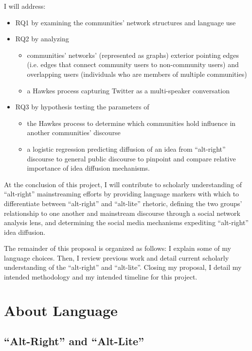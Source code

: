 \documentclass[acmlarge, screen, authorversion]{acmart}
\begin{document}
I will address:
\begin{itemize}
    \item RQ1 by examining the communities’ network structures and language use
    \item RQ2 by analyzing
    \begin{itemize}
        \item communities’ networks’ (represented as graphs) exterior pointing edges
(i.e. edges that connect community users to non-community users) and
overlapping users (individuals who are members of multiple communities)
        \item a Hawkes process capturing Twitter as a multi-speaker
conversation
    \end{itemize}
\item RQ3 by hypothesis testing the parameters of
\begin{itemize}
    \item the Hawkes
process to determine which communities hold influence in another
communities’ discourse
\item a logistic regression predicting diffusion of an idea from
``alt-right” discourse to general public discourse to pinpoint and compare relative importance of idea diffusion mechanisms.
\end{itemize}
\end{itemize}

At the conclusion of this project, I will contribute to scholarly understanding of ``alt-right'' mainstreaming efforts by providing language markers with which to differentiate between ``alt-right'' and ``alt-lite'' rhetoric, defining the two groups' relationship to one another and mainstream discourse through a social network analysis lens, and 
 determining the social media mechanisms expediting ``alt-right'' idea diffusion.
 
 \medskip

The remainder of this proposal is organized as follows: I explain some of my language choices. Then, I review previous work and
detail current scholarly understanding of the “alt-right” and
“alt-lite”. Closing my proposal, I detail my intended methodology and my
intended timeline for this project.

\section{About Language}

\subsection{“Alt-Right” and “Alt-Lite”}
\end{document}

